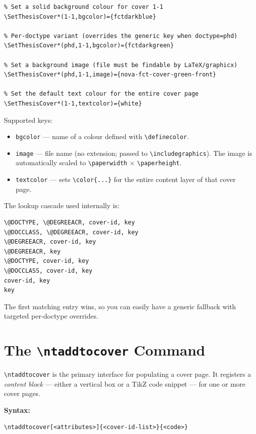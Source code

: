 \begin{verbatim}
% Set a solid background colour for cover 1-1
\SetThesisCover*(1-1,bgcolor)={fctdarkblue}

% Per-doctype variant (overrides the generic key when doctype=phd)
\SetThesisCover*(phd,1-1,bgcolor)={fctdarkgreen}

% Set a background image (file must be findable by LaTeX/graphicx)
\SetThesisCover*(phd,1-1,image)={nova-fct-cover-green-front}

% Set the default text colour for the entire cover page
\SetThesisCover*(1-1,textcolor)={white}
\end{verbatim}

Supported keys:
\begin{itemize}
  \item \verb!bgcolor! — name of a colour defined with \verb!\definecolor!.
  \item \verb!image! — file name (no extension; passed to
        \verb!\includegraphics!).  The image is automatically scaled to
        \verb!\paperwidth! $\times$ \verb!\paperheight!.
  \item \verb!textcolor! — sets \verb!\color{...}! for the entire content
        layer of that cover page.
\end{itemize}

The lookup cascade used internally is:
\begin{verbatim}
\@DOCTYPE, \@DEGREEACR, cover-id, key
\@DOCCLASS, \@DEGREEACR, cover-id, key
\@DEGREEACR, cover-id, key
\@DEGREEACR, key
\@DOCTYPE, cover-id, key
\@DOCCLASS, cover-id, key
cover-id, key
key
\end{verbatim}

The first matching entry wins, so you can easily have a generic fallback with
targeted per-doctype overrides.


\section{The \texttt{\textbackslash ntaddtocover} Command}
\label{sec:ntaddtocover}

\verb!\ntaddtocover! is the primary interface for populating a cover page.
It registers a \emph{content block} — either a vertical box or a TikZ code
snippet — for one or more cover pages.

\medskip
\noindent\textbf{Syntax:}
\begin{verbatim}
\ntaddtocover[<attributes>]{<cover-id-list>}{<code>}
\end{verbatim}

